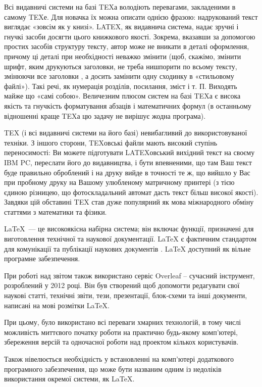 Всі видавничі системи на базі TEXа володіють перевагами, закладеними в самому TEXе. Для новачка їх можна описати однією фразою: надрукований текст виглядає «зовсім як у книзі». LATEX, як видавнича система, надає зручні і гнучкі засоби досягти цього книжкового якості. Зокрема, вказавши за допомогою простих засобів структуру тексту, автор може не вникати в деталі оформлення, причому ці деталі при необхідності неважко змінити (щоб, скажімо, змінити шрифт, яким друкуються заголовки, не треба нишпорити по всьому тексту, змінюючи все заголовки , а досить замінити одну сходинку в «стильовому файлі»). Такі речі, як нумерація розділів, посилання, зміст і т. П. Виходять майже що «самі собою». Величезним плюсом систем на базі TEXа є висока якість та гнучкість форматування абзаців і математичних формул (в останньому відношенні краще TEXа цю задачу не вирішує жодна програма).

TEX (і всі видавничі системи на його базі) невибагливий до використовуваної техніки. З іншого сторони, TEXовські файли мають високий ступінь переносимості: Ви можете підготувати LATEXовський вихідний текст на своєму IBM PC, переслати його до видавництва, і бути впевненими, що там Ваш текст буде правильно оброблений і на друку вийде в точності те ж, що вийшло у Вас при пробному друку на Вашому улюбленому матричному принтері (з тією єдиною різницею, що фотоскладальний автомат дасть текст більш високої якості). Завдяки цій обставині TEX став дуже популярний як мова міжнародного обміну статтями з математики та фізики.

LaTeX~--- це високоякісна набірна система; він включає функції, призначені для виготовлення технічної та наукової документації. LaTeX є фактичним стандартом для комунікації та публікації наукових документів \cite{lamport1994latex}. LaTeX доступний як вільне програмне забезпечення.

При роботі над звітом також використано сервіс Overleaf -- сучасний інструмент, розроблений у 2012 році. Він був створений щоб допомогти редагувати свої наукові статті, технічні звіти, тези, презентації, блок-схеми та інші документи, написані на мові розмітки LaTeX. 

При цьому, було використано всі переваги хмарних технологій, в тому числі можливість миттєвого початку роботи на практично будь-якому комп'ютері, збереження версій та одночасної роботи над проектом кількох користувачів.

Також нівелюється необхідність у встановленні на комп'ютері додаткового програмного забезпечення, що може бути названим одним із недоліків використання окремої системи, як LaTeX.

